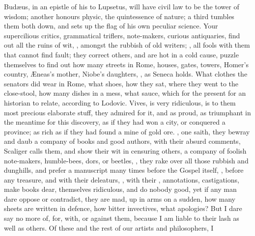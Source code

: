 {Bud\ae{}us, in an epistle of his to Lupsetus, will have civil law to be
the tower of wisdom; another honours physic, the quintessence of
nature; a third tumbles them both down, and sets up the flag of his own
peculiar science. Your supercilious critics, grammatical triflers,
note-makers, curious antiquaries, find out all the ruins of wit,
, amongst the rubbish of old writers; , all fools with them that cannot find fault;
they correct others, and are hot in a cold cause, puzzle themselves to
find out how many streets in Rome, houses, gates, towers, Homer's
country, \AE{}neas's mother, Niobe's daughters,  , as Seneca holds. What clothes the
senators did wear in Rome, what shoes, how they sat, where they went to
the close-stool, how many dishes in a mess, what sauce, which for the
present for an historian to relate, according to Lodovic. Vives,
is very ridiculous, is to them most precious elaborate stuff, they
admired for it, and as proud, as triumphant in the meantime for this
discovery, as if they had won a city, or conquered a province; as rich
as if they had found a mine of gold ore. , one saith, they bewray and daub
a company of books and good authors, with their absurd comments,
 Scaliger calls them, and show their wit
in censuring others, a company of foolish note-makers, humble-bees,
dors, or beetles, , they rake over
all those rubbish and dunghills, and prefer a manuscript many times
before the Gospel itself, , before any treasure,
and with their deleaturs, , with
their , annotations, castigations, \etc{} make books
dear, themselves ridiculous, and do nobody good, yet if any man dare
oppose or contradict, they are mad, up in arms on a sudden, how many
sheets are written in defence, how bitter invectives, what apologies?
 But I dare say no more of,
for, with, or against them, because I am liable to their lash as well
as others. Of these and the rest of our artists and philosophers, I
}
